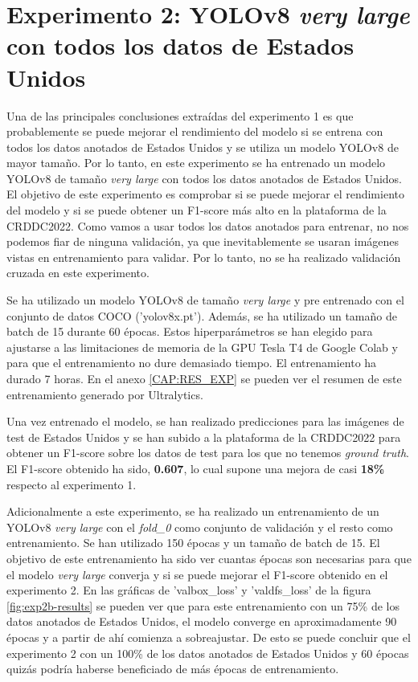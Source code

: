 \section{Experimento 2: YOLOv8 \textit{very large} con todos los datos de Estados Unidos}\label{SEC:EXP2}

Una de las principales conclusiones extraídas del experimento 1 es que probablemente se puede mejorar el rendimiento del modelo si se entrena con todos los datos anotados de Estados Unidos y se utiliza un modelo YOLOv8 de mayor tamaño. Por lo tanto, en este experimento se ha entrenado un modelo YOLOv8 de tamaño \textit{very large} con todos los datos anotados de Estados Unidos. El objetivo de este experimento es comprobar si se puede mejorar el rendimiento del modelo y si se puede obtener un F1-score más alto en la plataforma de la CRDDC2022. Como vamos a usar todos los datos anotados para entrenar, no nos podemos fiar de ninguna validación, ya que inevitablemente se usaran imágenes vistas en entrenamiento para validar. Por lo tanto, no se ha realizado validación cruzada en este experimento.

Se ha utilizado un modelo YOLOv8 de tamaño \textit{very large} y pre entrenado con el conjunto de datos COCO ('yolov8x.pt'). Además, se ha utilizado un tamaño de batch de 15 durante 60 épocas. Estos hiperparámetros se han elegido para ajustarse a las limitaciones de memoria de la GPU Tesla T4 de Google Colab y para que el entrenamiento no dure demasiado tiempo. El entrenamiento ha durado 7 horas. En el anexo \ref{CAP:RES_EXP} se pueden ver el resumen de este entrenamiento generado por Ultralytics.

Una vez entrenado el modelo, se han realizado predicciones para las imágenes de test de Estados Unidos y se han subido a la plataforma de la CRDDC2022 para obtener un F1-score sobre los datos de test para los que no tenemos \textit{ground truth}. El F1-score obtenido ha sido, \textbf{0.607}, lo cual supone una mejora de casi \textbf{18\%} respecto al experimento 1.

Adicionalmente a este experimento, se ha realizado un entrenamiento de un YOLOv8 \textit{very large} con el \textit{fold\_0} como conjunto de validación y el resto como entrenamiento. Se han utilizado 150 épocas y un tamaño de batch de 15. El objetivo de este entrenamiento ha sido ver cuantas épocas son necesarias para que el modelo \textit{very large} converja y si se puede mejorar el F1-score obtenido en el experimento 2. En las gráficas de 'val\/box\_loss' y 'val\/dfs\_loss' de la figura \ref{fig:exp2b-results} se pueden ver que para este entrenamiento con un 75\% de los datos anotados de Estados Unidos, el modelo converge en aproximadamente 90 épocas y a partir de ahí comienza a sobreajustar. De esto se puede concluir que el experimento 2 con un 100\% de los datos anotados de Estados Unidos y 60 épocas quizás podría haberse beneficiado de más épocas de entrenamiento.

